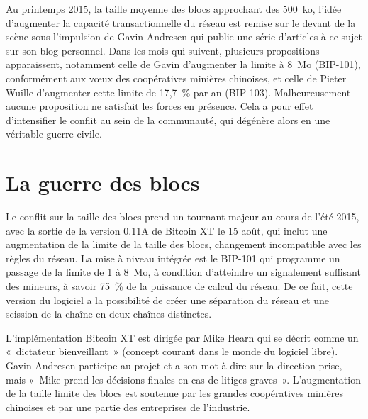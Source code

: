 Au printemps 2015, la taille moyenne des blocs approchant des 500~ko, l'idée d'augmenter la capacité transactionnelle du réseau est remise sur le devant de la scène sous l'impulsion de Gavin Andresen qui publie une série d'articles à ce sujet sur son blog personnel. Dans les mois qui suivent, plusieurs propositions apparaissent, notamment celle de Gavin d'augmenter la limite à 8~Mo (BIP-101), conformément aux vœux des coopératives minières chinoises, et celle de Pieter Wuille d'augmenter cette limite de 17,7~\% par an (BIP-103). Malheureusement aucune proposition ne satisfait les forces en présence. Cela a pour effet d'intensifier le conflit au sein de la communauté, qui dégénère alors en une véritable guerre civile.

\section*{La guerre des blocs} %

Le conflit sur la taille des blocs prend un tournant majeur au cours de l'été 2015, avec la sortie de la version 0.11A de Bitcoin XT le 15 août, qui inclut une augmentation de la limite de la taille des blocs, changement incompatible avec les règles du réseau. La mise à niveau intégrée est le BIP-101 qui programme un passage de la limite de 1 à 8~Mo, à condition d'atteindre un signalement suffisant des mineurs, à savoir 75~\% de la puissance de calcul du réseau. De ce fait, cette version du logiciel a la possibilité de créer une séparation du réseau et une scission de la chaîne en deux chaînes distinctes.

L'implémentation Bitcoin XT est dirigée par Mike Hearn qui se décrit comme un «~dictateur bienveillant~» (concept courant dans le monde du logiciel libre). Gavin Andresen participe au projet et a son mot à dire sur la direction prise, mais «~Mike prend les décisions finales en cas de litiges graves~». L'augmentation de la taille limite des blocs est soutenue par les grandes coopératives minières chinoises et par une partie des entreprises de l'industrie.

